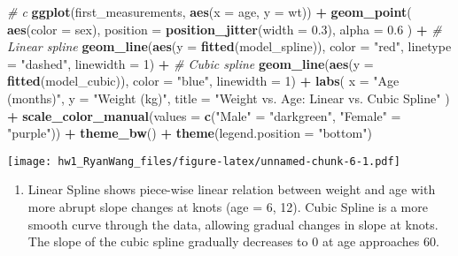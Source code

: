 \documentclass[
]{article}
\newenvironment{Shaded}{\begin{snugshade}}{\end{snugshade}}
\newcommand{\AttributeTok}[1]{\textcolor[rgb]{0.13,0.29,0.53}{#1}}
\newcommand{\CommentTok}[1]{\textcolor[rgb]{0.56,0.35,0.01}{\textit{#1}}}
\newcommand{\DecValTok}[1]{\textcolor[rgb]{0.00,0.00,0.81}{#1}}
\newcommand{\FloatTok}[1]{\textcolor[rgb]{0.00,0.00,0.81}{#1}}
\newcommand{\FunctionTok}[1]{\textcolor[rgb]{0.13,0.29,0.53}{\textbf{#1}}}
\newcommand{\NormalTok}[1]{#1}
\newcommand{\OtherTok}[1]{\textcolor[rgb]{0.56,0.35,0.01}{#1}}
\newcommand{\SpecialCharTok}[1]{\textcolor[rgb]{0.81,0.36,0.00}{\textbf{#1}}}
\newcommand{\StringTok}[1]{\textcolor[rgb]{0.31,0.60,0.02}{#1}}
\providecommand{\tightlist}{%
  \setlength{\itemsep}{0pt}\setlength{\parskip}{0pt}}
\begin{document}
\begin{Shaded}
\begin{Highlighting}[]
\CommentTok{\# c}
\FunctionTok{ggplot}\NormalTok{(first\_measurements, }\FunctionTok{aes}\NormalTok{(}\AttributeTok{x =}\NormalTok{ age, }\AttributeTok{y =}\NormalTok{ wt)) }\SpecialCharTok{+}
  \FunctionTok{geom\_point}\NormalTok{(}
    \FunctionTok{aes}\NormalTok{(}\AttributeTok{color =}\NormalTok{ sex),}
    \AttributeTok{position =} \FunctionTok{position\_jitter}\NormalTok{(}\AttributeTok{width =} \FloatTok{0.3}\NormalTok{),}
    \AttributeTok{alpha =} \FloatTok{0.6}
\NormalTok{  ) }\SpecialCharTok{+}
  \CommentTok{\# Linear spline}
  \FunctionTok{geom\_line}\NormalTok{(}\FunctionTok{aes}\NormalTok{(}\AttributeTok{y =} \FunctionTok{fitted}\NormalTok{(model\_spline)), }\AttributeTok{color =} \StringTok{"red"}\NormalTok{, }\AttributeTok{linetype =} \StringTok{"dashed"}\NormalTok{, }\AttributeTok{linewidth =} \DecValTok{1}\NormalTok{) }\SpecialCharTok{+}
  \CommentTok{\# Cubic spline}
  \FunctionTok{geom\_line}\NormalTok{(}\FunctionTok{aes}\NormalTok{(}\AttributeTok{y =} \FunctionTok{fitted}\NormalTok{(model\_cubic)), }\AttributeTok{color =} \StringTok{"blue"}\NormalTok{, }\AttributeTok{linewidth =} \DecValTok{1}\NormalTok{) }\SpecialCharTok{+}
  \FunctionTok{labs}\NormalTok{(}
    \AttributeTok{x =} \StringTok{"Age (months)"}\NormalTok{,}
    \AttributeTok{y =} \StringTok{"Weight (kg)"}\NormalTok{,}
    \AttributeTok{title =} \StringTok{"Weight vs. Age: Linear vs. Cubic Spline"}
\NormalTok{  ) }\SpecialCharTok{+}
  \FunctionTok{scale\_color\_manual}\NormalTok{(}\AttributeTok{values =} \FunctionTok{c}\NormalTok{(}\StringTok{"Male"} \OtherTok{=} \StringTok{"darkgreen"}\NormalTok{, }\StringTok{"Female"} \OtherTok{=} \StringTok{"purple"}\NormalTok{)) }\SpecialCharTok{+}
  \FunctionTok{theme\_bw}\NormalTok{() }\SpecialCharTok{+}
  \FunctionTok{theme}\NormalTok{(}\AttributeTok{legend.position =} \StringTok{"bottom"}\NormalTok{)}
\end{Highlighting}
\end{Shaded}

\texttt{[image: hw1\_RyanWang\_files/figure-latex/unnamed-chunk-6-1.pdf]}

\begin{enumerate}
\def\labelenumi{\alph{enumi}.}
\setcounter{enumi}{3}
\tightlist
\item
  Linear Spline shows piece-wise linear relation between weight and age
  with more abrupt slope changes at knots (age = 6, 12). Cubic Spline is
  a more smooth curve through the data, allowing gradual changes in
  slope at knots. The slope of the cubic spline gradually decreases to 0
  at age approaches 60.
\end{enumerate}
\end{document}
